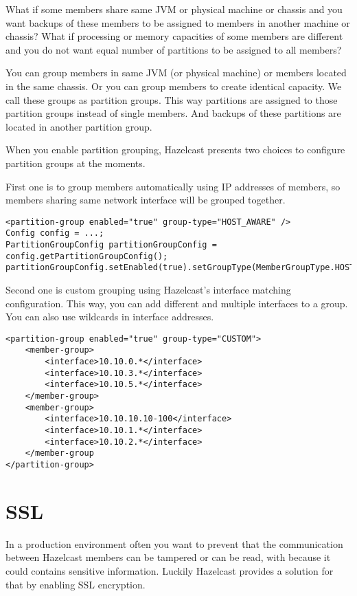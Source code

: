 What if some members share same JVM or physical machine or chassis and you want backups of these members to be assigned to members in another machine or chassis? What if processing or memory capacities of some members are different and you do not want equal number of partitions to be assigned to all members?

You can group members in same JVM (or physical machine) or members located in the same chassis. Or you can group members to create identical capacity. We call these groups as partition groups. This way partitions are assigned to those partition groups instead of single members. And backups of these partitions are located in another partition group.

When you enable partition grouping, Hazelcast presents two choices to configure partition groups at the moments.

First one is to group members automatically using IP addresses of members, so members sharing same network interface will be grouped together.

\begin{lstlisting}
<partition-group enabled="true" group-type="HOST_AWARE" />
Config config = ...;
PartitionGroupConfig partitionGroupConfig = config.getPartitionGroupConfig();
partitionGroupConfig.setEnabled(true).setGroupType(MemberGroupType.HOST_AWARE);
\end{lstlisting}

Second one is custom grouping using Hazelcast's interface matching configuration. This way, you can add different and multiple interfaces to a group. You can also use wildcards in interface addresses.

\begin{lstlisting}
<partition-group enabled="true" group-type="CUSTOM">
    <member-group>
        <interface>10.10.0.*</interface>
        <interface>10.10.3.*</interface>
        <interface>10.10.5.*</interface>
    </member-group>
    <member-group>
        <interface>10.10.10.10-100</interface>
        <interface>10.10.1.*</interface>
        <interface>10.10.2.*</interface>
    </member-group
</partition-group>
\end{lstlisting}

\section{SSL}
In a production environment often you want to prevent that the communication between Hazelcast members can be tampered or can be read, with because it could contains sensitive information. Luckily Hazelcast provides a solution for that by enabling SSL encryption.

